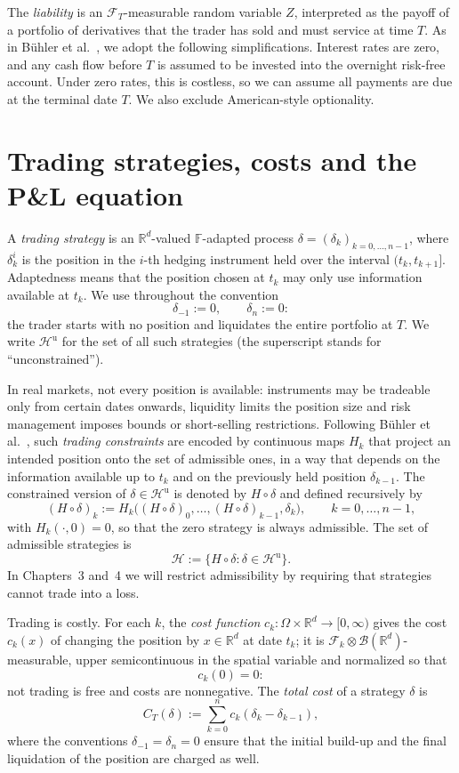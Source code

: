 \documentclass[11pt,a4paper]{report}
\numberwithin{equation}{chapter}
\theoremstyle{plain}
\theoremstyle{definition}
\newcommand{\R}{\mathbb{R}}
\newcommand{\F}{\mathcal{F}}
\newcommand{\HH}{\mathcal{H}}
\newcommand{\Hu}{\mathcal{H}^{\mathrm{u}}}
\begin{document}
The \emph{liability} is an $\F_T$-measurable random variable $Z$, interpreted as the payoff of a portfolio of derivatives that the trader has sold and must service at time $T$. As in B\"uhler et al.\ \cite[Section~2]{buehler}, we adopt the following simplifications. Interest rates are zero, and any cash flow before $T$ is assumed to be invested into the overnight risk-free account. Under zero rates, this is costless, so we can assume all payments are due at the terminal date $T$. We also exclude American-style optionality.

\section{Trading strategies, costs and the P\&L equation}\label{sec:pnl}

A \emph{trading strategy} is an $\R^d$-valued $\mathbb{F}$-adapted process $\delta=(\delta_k)_{k=0,\dots,n-1}$, where $\delta_k^i$ is the position in the $i$-th hedging instrument held over the interval $(t_k,t_{k+1}]$. Adaptedness means that the position chosen at $t_k$ may only use information available at $t_k$. We use throughout the convention
\[
    \delta_{-1}:=0,\qquad\delta_n:=0:
\]
the trader starts with no position and liquidates the entire portfolio at $T$. We write $\Hu$ for the set of all such strategies (the superscript stands for ``unconstrained'').

In real markets, not every position is available: instruments may be tradeable only from certain dates onwards, liquidity limits the position size and risk management imposes bounds or short-selling restrictions. Following B\"uhler et al.\ \cite[Section~2.4]{buehler}, such \emph{trading constraints} are encoded by continuous maps $H_k$ that project an intended position onto the set of admissible ones, in a way that depends on the information available up to $t_k$ and on the previously held position $\delta_{k-1}$. The constrained version of $\delta\in\Hu$ is denoted by $H\circ\delta$ and defined recursively by
\[
    (H\circ\delta)_k:=H_k\bigl((H\circ\delta)_0,\dots,(H\circ\delta)_{k-1},\delta_k\bigr),\qquad k=0,\dots,n-1,
\]
with $H_k(\cdot,0)=0$, so that the zero strategy is always admissible. The set of admissible strategies is
\[
    \HH:=\{H\circ\delta:\delta\in\Hu\}.
\]
In Chapters~3 and~4 we will restrict admissibility by requiring that strategies cannot trade into a loss.

Trading is costly. For each $k$, the \emph{cost function} $c_k\colon\Omega\times\R^d\to[0,\infty)$ gives the cost $c_k(x)$ of changing the position by $x\in\R^d$ at date $t_k$; it is $\F_k\otimes\mathcal{B}(\R^d)$-measurable, upper semicontinuous in the spatial variable and normalized so that
\[
    c_k(0)=0:
\]
not trading is free and costs are nonnegative. The \emph{total cost} of a strategy $\delta$ is
\[
    C_T(\delta):=\sum_{k=0}^{n}c_k(\delta_k-\delta_{k-1}),
\]
where the conventions $\delta_{-1}=\delta_n=0$ ensure that the initial build-up and the final liquidation of the position are charged as well.
\end{document}
